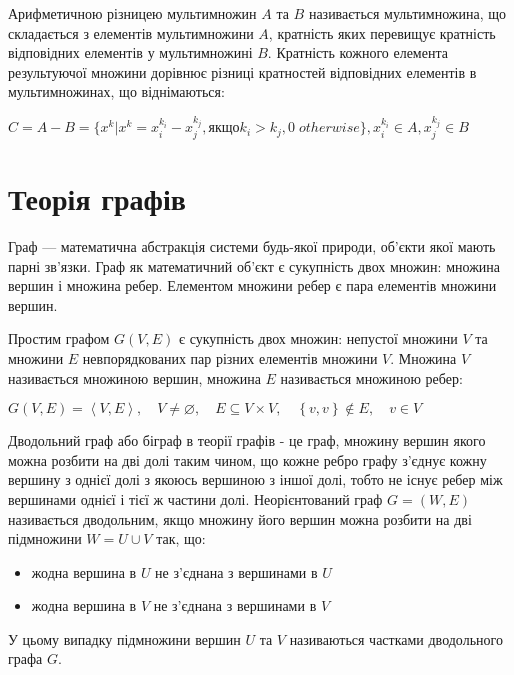 \begin{definition}
Арифметичною різницею мультимножин  $A$ та $B$ називається мультимножина, що складається з елементів мультимножини $A$, кратність яких перевищує кратність відповідних елементів у мультимножині $B$. Кратність кожного елемента результуючої множини дорівнює різниці кратностей відповідних елементів в мультимножинах, що віднімаються:
\begin{center}
$C = A-B = \{x^k | x^k = x_i^{k_i}-x_j^{k_j}, якщо k_i>k_j, 0 \; otherwise \},  x_i^{k_i} \in A, x_j^{k_j} \in B$
\end{center}
\end{definition}


\section{Теорія графів}

\begin{definition}
Граф — математична абстракція системи будь-якої природи, об'єкти якої мають парні зв'язки. Граф як математичний об'єкт є сукупність двох множин: множина вершин і множина ребер. Елементом множини ребер є пара елементів множини вершин.
\end{definition}

\begin{definition}
Простим графом $G(V,E)$ є сукупність двох множин: непустої множини $V$ та множини $E$ невпорядкованих пар різних елементів множини $V$. Множина $V$ називається множиною вершин, множина $E$ називається множиною ребер:
\begin{center}
$ G(V,E)=\left\langle V,E\right\rangle ,\quad V\neq \varnothing ,\quad E\subseteq V\times V,\quad \left\{v,v\right\}\notin E,\quad v\in V$
\end{center}
\end{definition}

\begin{definition}
Дводольний граф або біграф в теорії графів - це граф, множину вершин якого можна розбити на дві долі таким чином, що кожне ребро графу з'єднує кожну вершину з однієї долі з якоюсь вершиною з іншої долі, тобто не існує ребер між вершинами однієї і тієї ж частини долі. Неорієнтований граф $G=(W,E)$ називається дводольним, якщо множину його вершин можна розбити на дві підмножини $ W = U \cup V $ так, що:
\begin{itemize}
\item жодна вершина в $U$ не з'єднана з вершинами в $U$
\item жодна вершина в $V$ не з'єднана з вершинами в $V$
\end{itemize}

У цьому випадку підмножини вершин $U$ та $V$ називаються частками дводольного графа $G$.
\end{definition}



